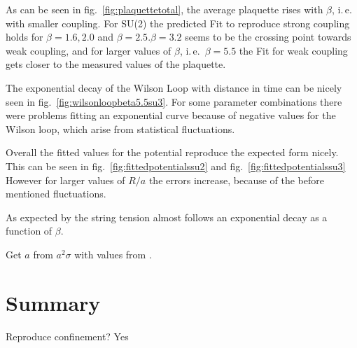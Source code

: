 \documentclass[%
 reprint,
 amsmath,amssymb,
 aps,
]{revtex4-1}
\begin{document}

As can be seen in fig.~\ref{fig:plaquettetotal}, the average
 plaquette rises with $\beta$, i.\,e.\, with smaller coupling. 
For SU(2) the predicted Fit to reproduce strong coupling holds for $\beta=1.6, 2.0$ and $\beta=2.5$.$\beta=3.2$ seems to be the crossing point towards weak coupling, and for larger values of $\beta$, i.\,e.\, $\beta=5.5$ the Fit for weak coupling gets closer to the measured values of the plaquette.

The exponential decay of the Wilson Loop with distance in time can be nicely seen in fig.~\ref{fig:wilsonloopbeta5.5su3}. For some parameter combinations there were problems fitting an exponential curve because of negative values for the Wilson loop, which arise from statistical fluctuations.


Overall the fitted values for the potential reproduce the expected form nicely. This can be seen in fig.~\ref{fig:fittedpotentialssu2} and fig.~\ref{fig:fittedpotentialssu3} However for larger values of $R/a$ the errors increase, because of the before mentioned fluctuations.


As expected by \citet{creutzsu2} the string tension almost follows an exponential decay as a function of $\beta$.


Get $a$ from $a^2\sigma$ with values from \cite{Cardoso_2011}.
%
%

\section{Summary}

Reproduce confinement? Yes


\end{document}

